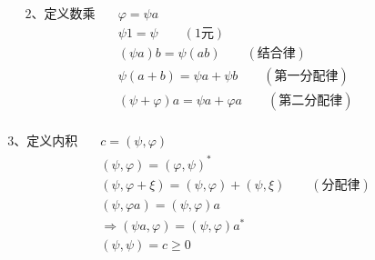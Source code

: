 \begin{frame} 
    \begin{equation*}
        \begin{split}
            \text{2、定义数乘} \quad &\varphi=\psi a\\
            &\psi 1= \psi \qquad (\text{1元})\\
            &(\psi a)b=\psi (ab) \qquad (\text{结合律})\\
            &\psi(a+b)= \psi a+ \psi b \qquad (\text{第一分配律})\\
            &(\psi+\varphi) a= \psi a +\varphi a \qquad (\text{第二分配律})\\
        \end{split}  
    \end{equation*}
\end{frame} 

\begin{frame} 
    \begin{equation*}
        \begin{split}
            \text{3、定义内积} \quad &c=(\psi, \varphi)\\
            &(\psi, \varphi)= (\varphi,\psi)^* \\
            &(\psi, \varphi+\xi)= (\psi, \varphi) + (\psi, \xi)\qquad (\text{分配律})\\
            &(\psi, \varphi a)= (\psi, \varphi )a \\
            &\Rightarrow (\psi a, \varphi )= (\psi, \varphi )a^* \\
            &(\psi,\psi)= c\ge 0\\
        \end{split}  
    \end{equation*}
\end{frame}

